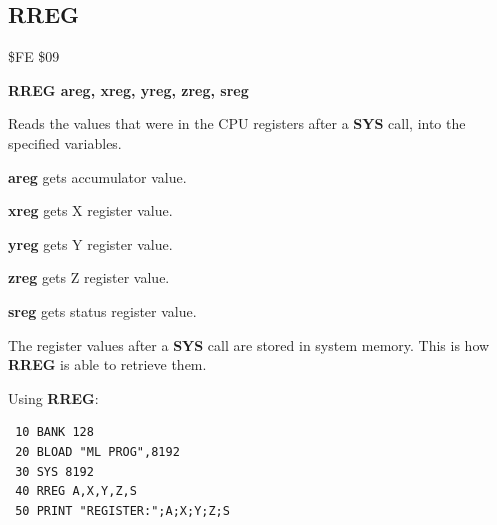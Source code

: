 
\newpage
\subsection{RREG}
\begin{description}[leftmargin=2cm,style=nextline]
\item [Token:] \$FE \$09
\item [Format:] {\bf RREG areg, xreg, yreg, zreg, sreg}
\item [Usage:] Reads the values that were in the CPU registers
               after a {\bf SYS} call, into the specified variables.

               {\bf areg} gets accumulator value.

               {\bf xreg} gets X register value.

               {\bf yreg} gets Y register value.

               {\bf zreg} gets Z register value.

               {\bf sreg} gets status register value.

\item [Remarks:] The register values after a {\bf SYS} call are stored
                 in system memory. This is how
                 {\bf RREG} is able to retrieve them.

\item [Example:] Using {\bf RREG}:
\begin{tcolorbox}[colback=black,coltext=white]
\verbatimfont{\codefont}
\begin{verbatim}
 10 BANK 128
 20 BLOAD "ML PROG",8192
 30 SYS 8192
 40 RREG A,X,Y,Z,S
 50 PRINT "REGISTER:";A;X;Y;Z;S
\end{verbatim}
\end{tcolorbox}
\end{description}


\newpage
